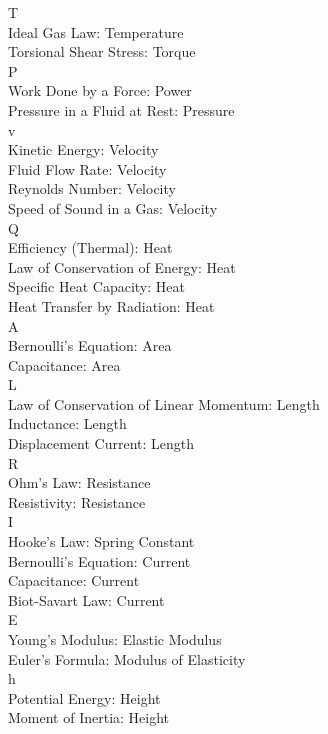 \documentclass{article}
\begin{document}
\begin{multicols}{2}
T \\

    Ideal Gas Law: Temperature \\
    Torsional Shear Stress: Torque \\

P \\

    Work Done by a Force: Power \\
    Pressure in a Fluid at Rest: Pressure \\

v \\

    Kinetic Energy: Velocity \\
    Fluid Flow Rate: Velocity \\
    Reynolds Number: Velocity \\
    Speed of Sound in a Gas: Velocity \\

Q \\

    Efficiency (Thermal): Heat \\
    Law of Conservation of Energy: Heat \\
    Specific Heat Capacity: Heat \\
    Heat Transfer by Radiation: Heat \\

A \\

    Bernoulli's Equation: Area \\
    Capacitance: Area \\

L \\

    Law of Conservation of Linear Momentum: Length \\
    Inductance: Length \\
    Displacement Current: Length \\

R \\

    Ohm's Law: Resistance \\
    Resistivity: Resistance \\

I \\

    Hooke's Law: Spring Constant \\
    Bernoulli's Equation: Current \\
    Capacitance: Current \\
    Biot-Savart Law: Current \\

E \\

    Young's Modulus: Elastic Modulus \\
    Euler's Formula: Modulus of Elasticity \\

h \\

    Potential Energy: Height \\
    Moment of Inertia: Height \\
\end{multicols}
\end{document}
